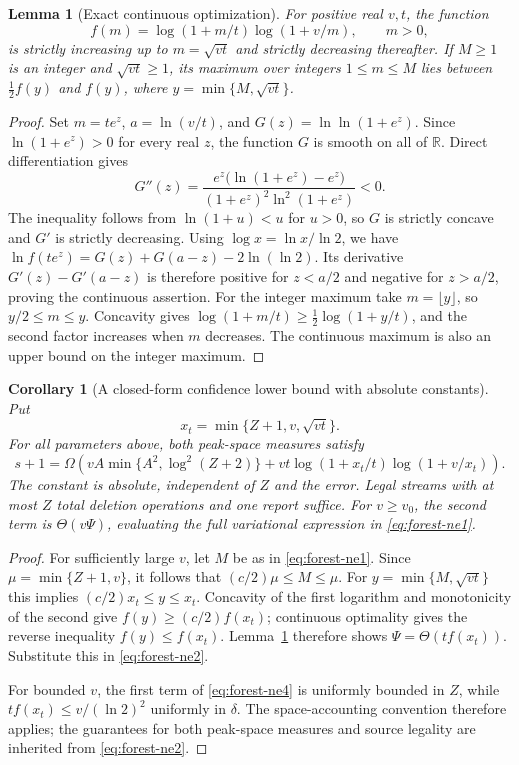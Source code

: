 \documentclass[11pt,letterpaper]{article}
\newtheorem{lemma}[theorem]{Lemma}
\newtheorem{corollary}[theorem]{Corollary}
\numberwithin{equation}{section}
\begin{document}
\begin{lemma}[Exact continuous optimization]
\label{lem:nearlinear-continuous-optimizer}
For positive real $v,t$, the function
\[
 f(m)=\log(1+m/t)\log(1+v/m),\qquad m>0,
\]
is strictly increasing up to $m=\sqrt{vt}$ and strictly decreasing thereafter.
If $M\ge1$ is an integer and $\sqrt{vt}\ge1$, its maximum over integers $1\le m\le M$ lies between $\tfrac12 f(y)$ and $f(y)$, where $y=\min\{M,\sqrt{vt}\}$.
\end{lemma}
\begin{proof}
Set $m=te^z$, $a=\ln(v/t)$, and $G(z)=\ln\ln(1+e^z)$.
Since $\ln(1+e^z)>0$ for every real $z$, the function $G$ is smooth on all of $\mathbb R$.
Direct differentiation gives
\[
 G''(z)=
 \frac{e^z\bigl(\ln(1+e^z)-e^z\bigr)}
 {(1+e^z)^2\ln^2(1+e^z)}<0.
\]
The inequality follows from $\ln(1+u)<u$ for $u>0$, so $G$ is strictly concave and $G'$ is strictly decreasing.
Using $\log x=\ln x/\ln 2$, we have $\ln f(te^z)=G(z)+G(a-z)-2\ln(\ln 2)$.
Its derivative $G'(z)-G'(a-z)$ is therefore positive for $z<a/2$ and negative for $z>a/2$, proving the continuous assertion.
For the integer maximum take $m=\lfloor y\rfloor$, so $y/2\le m\le y$.
Concavity gives $\log(1+m/t)\ge\tfrac12\log(1+y/t)$, and the second factor increases when $m$ decreases.
The continuous maximum is also an upper bound on the integer maximum.
\end{proof}

\begin{corollary}[A closed-form confidence lower bound with absolute constants]
\label{thm:nearlinear-entropy-lower}
Put
\begin{equation}
x_t = \min\{Z+1,v,\sqrt{vt}\}.
 \label{eq:forest-ne3}
\end{equation}
For all parameters above, both peak-space measures satisfy
\begin{equation}
s+1=\Omega\!\left(
 vA\min\{A^2,\log^2(Z+2)\}
 +vt\log(1+x_t/t)\log(1+v/x_t)\right).
 \label{eq:forest-ne4}
\end{equation}
The constant is absolute, independent of $Z$ and the error.
Legal streams with at most $Z$ total deletion operations and one report suffice.
For $v\ge v_0$, the second term is $\Theta(v\Psi)$, evaluating the full variational expression in \eqref{eq:forest-ne1}.
\end{corollary}
\begin{proof}
For sufficiently large $v$, let $M$ be as in \eqref{eq:forest-ne1}.
Since $\mu=\min\{Z+1,v\}$, it follows that $(c/2)\mu\le M\le\mu$.
For $y=\min\{M,\sqrt{vt}\}$ this implies $(c/2)x_t\le y\le x_t$.
Concavity of the first logarithm and monotonicity of the second give $f(y)\ge(c/2)f(x_t)$; continuous optimality gives the reverse inequality $f(y)\le f(x_t)$.
Lemma~\ref{lem:nearlinear-continuous-optimizer} therefore shows $\Psi=\Theta(t f(x_t))$.
Substitute this in \eqref{eq:forest-ne2}.

For bounded $v$, the first term of \eqref{eq:forest-ne4} is uniformly bounded in $Z$, while $t f(x_t)\le v/(\ln2)^2$ uniformly in $\delta$.
The space-accounting convention therefore applies; the guarantees for both peak-space measures and source legality are inherited from \eqref{eq:forest-ne2}.
\end{proof}
\end{document}
